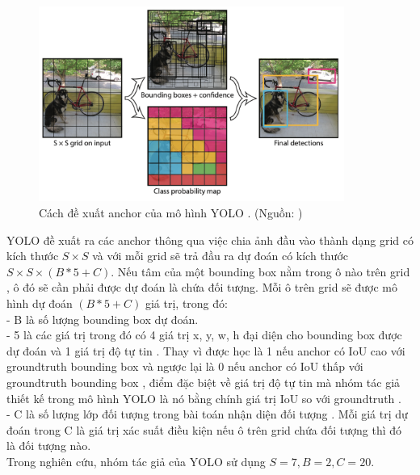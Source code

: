 {    \begin{figure}[H]
        \centering
        \includegraphics[width=10cm] {images/yolo_anchor}
        \caption{Cách đề xuất anchor  của mô hình YOLO . (Nguồn: \cite{redmon2016look})}
        \label{fig:yolo_anchor}
    \end{figure}

    \noindent
    YOLO  đề xuất ra các anchor  thông qua việc chia ảnh đầu vào thành dạng grid  có kích thước $S × S$ và với mỗi grid  sẽ trả đầu ra dự đoán có kích thước $S × S × (B * 5 + C)$.
    Nếu tâm của một bounding box  nằm trong ô nào trên grid , ô đó sẽ cần phải được dự đoán là chứa đối tượng.
    Mỗi ô trên grid  sẽ được mô hình dự đoán $(B * 5 + C)$ giá trị, trong đó: \\
    - B là số lượng bounding box  dự đoán. \\
    - 5 là các giá trị trong đó có 4 giá trị x, y, w, h đại diện cho bounding box  được dự đoán và 1 giá trị độ tự tin .
    Thay vì được học là 1 nếu anchor  có IoU  cao với groundtruth  bounding box  và ngược lại là 0 nếu anchor  có IoU  thấp với groundtruth  bounding box , điểm đặc biệt về giá trị độ tự tin  mà nhóm tác giả thiết kế trong mô hình YOLO  là nó bằng chính giá trị IoU  so với groundtruth . \\
    - C là số lượng lớp đối tượng  trong bài toán nhận diện đối tượng .
    Mỗi giá trị dự đoán trong C là giá trị xác suất điều kiện nếu ô trên grid  chứa đối tượng thì đó là đối tượng nào. \\
    Trong nghiên cứu, nhóm tác giả của YOLO  sử dụng $S = 7, B = 2, C = 20$.

}
